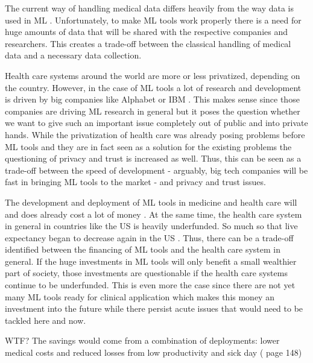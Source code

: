 The current way of handling medical data differs heavily from the way data is used in ML \cite{he2019practical}. Unfortunately, to make ML tools work properly there is a need for huge amounts of data that will be shared with the respective companies and researchers. This creates a trade-off between the classical handling of medical data and a necessary data collection.


Health care systems around the world are more or less privatized, depending on the country. However, in the case of ML tools a lot of research and development is driven by big companies like Alphabet or IBM \cite{Morley2020}. This makes sense since those companies are driving ML research in general but it poses the question whether we want to give such an important issue completely out of public and into private hands. While the privatization of health care was already posing problems before ML tools and they are in fact seen as a solution for the existing problems \cite{Morley2020, topol2019high} the questioning of privacy and trust is increased as well. Thus, this can be seen as a trade-off between the speed of development - arguably, big tech companies will be fast in bringing ML tools to the market - and privacy and trust issues.


The development and deployment of ML tools in medicine and health care will and does already cost a lot of money  \cite{he2019practical}. At the same time, the health care system in general in countries like the US is heavily underfunded. So much so that live expectancy began to decrease again in the US \cite{topol2019high}. Thus, there can be a trade-off identified between the financing of ML tools and the health care system in general. If the huge investments in ML tools will only benefit a small wealthier part of society, those investments are questionable if the health care systems continue to be underfunded. This is even more the case since there are not yet many ML tools ready for clinical application which makes this money an investment into the future while there persist acute issues that would need to be tackled here and now.


WTF?  The savings would come from a combination of deployments: lower medical costs and reduced losses from low productivity and sick day (\cite{horgan2019artificial} page 148)


